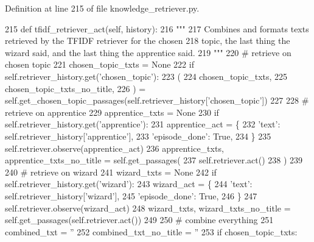 Definition at line 215 of file knowledge\+\_\+retriever.\+py.


\begin{DoxyCode}
215     \textcolor{keyword}{def }tfidf\_retriever\_act(self, history):
216         \textcolor{stringliteral}{"""}
217 \textcolor{stringliteral}{        Combines and formats texts retrieved by the TFIDF retriever for the chosen}
218 \textcolor{stringliteral}{        topic, the last thing the wizard said, and the last thing the apprentice said.}
219 \textcolor{stringliteral}{        """}
220         \textcolor{comment}{# retrieve on chosen topic}
221         chosen\_topic\_txts = \textcolor{keywordtype}{None}
222         \textcolor{keywordflow}{if} self.retriever\_history.get(\textcolor{stringliteral}{'chosen\_topic'}):
223             (
224                 chosen\_topic\_txts,
225                 chosen\_topic\_txts\_no\_title,
226             ) = self.get\_chosen\_topic\_passages(self.retriever\_history[\textcolor{stringliteral}{'chosen\_topic'}])
227 
228         \textcolor{comment}{# retrieve on apprentice}
229         apprentice\_txts = \textcolor{keywordtype}{None}
230         \textcolor{keywordflow}{if} self.retriever\_history.get(\textcolor{stringliteral}{'apprentice'}):
231             apprentice\_act = \{
232                 \textcolor{stringliteral}{'text'}: self.retriever\_history[\textcolor{stringliteral}{'apprentice'}],
233                 \textcolor{stringliteral}{'episode\_done'}: \textcolor{keyword}{True},
234             \}
235             self.retriever.observe(apprentice\_act)
236             apprentice\_txts, apprentice\_txts\_no\_title = self.get\_passages(
237                 self.retriever.act()
238             )
239 
240         \textcolor{comment}{# retrieve on wizard}
241         wizard\_txts = \textcolor{keywordtype}{None}
242         \textcolor{keywordflow}{if} self.retriever\_history.get(\textcolor{stringliteral}{'wizard'}):
243             wizard\_act = \{
244                 \textcolor{stringliteral}{'text'}: self.retriever\_history[\textcolor{stringliteral}{'wizard'}],
245                 \textcolor{stringliteral}{'episode\_done'}: \textcolor{keyword}{True},
246             \}
247             self.retriever.observe(wizard\_act)
248             wizard\_txts, wizard\_txts\_no\_title = self.get\_passages(self.retriever.act())
249 
250         \textcolor{comment}{# combine everything}
251         combined\_txt = \textcolor{stringliteral}{''}
252         combined\_txt\_no\_title = \textcolor{stringliteral}{''}
253         \textcolor{keywordflow}{if} chosen\_topic\_txts:

\end{DoxyCode}
